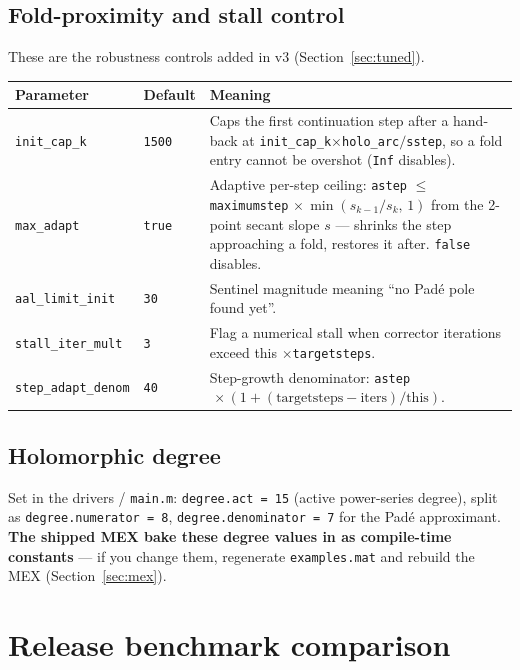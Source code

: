 \documentclass[11pt,a4paper]{article}
\newcommand{\code}[1]{\texttt{#1}}
\begin{document}
\subsection{Fold-proximity and stall control}
These are the robustness controls added in v3 (Section~\ref{sec:tuned}).
\begin{center}\small
\begin{longtable}{@{}p{}p{}p{}@{}}
\toprule
\textbf{Parameter} & \textbf{Default} & \textbf{Meaning}\\
\midrule\endhead
\code{init_cap_k}    & \code{1500} & Caps the first continuation step after a hand-back at \code{init_cap_k}$\times$\code{holo_arc}$/$\code{sstep}, so a fold entry cannot be overshot (\code{Inf} disables).\\
\code{max_adapt}     & \code{true} & Adaptive per-step ceiling: \code{astep} $\le$ \code{maximumstep}$\,\times\min(s_{k-1}/s_k,\,1)$ from the 2-point secant slope $s$ --- shrinks the step approaching a fold, restores it after. \code{false} disables.\\
\code{aal_limit_init}& \code{30}   & Sentinel magnitude meaning ``no Pad\'e pole found yet''.\\
\code{stall_iter_mult}& \code{3}   & Flag a numerical stall when corrector iterations exceed this $\times$\code{targetsteps}.\\
\code{step_adapt_denom}& \code{40} & Step-growth denominator: \code{astep}$\,\times(1+(\text{targetsteps}-\text{iters})/\text{this})$.\\
\bottomrule
\end{longtable}
\end{center}

\subsection{Holomorphic degree}
Set in the drivers / \code{main.m}: \code{degree.act = 15} (active power-series degree),
split as \code{degree.numerator = 8}, \code{degree.denominator = 7} for the Pad\'e
approximant. \textbf{The shipped MEX bake these degree values in as compile-time
constants} --- if you change them, regenerate \code{examples.mat} and rebuild the MEX
(Section~\ref{sec:mex}).

\section{Release benchmark comparison}\label{sec:benchmark}
\end{document}

